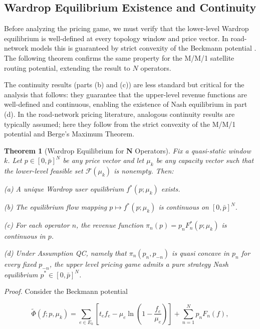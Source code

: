 \documentclass[review,3p,authoryear]{elsarticle}
\newtheorem{theorem}{Theorem}[section]
\begin{document}
\subsection{Wardrop Equilibrium Existence and Continuity}

Before analyzing the pricing game, we must verify that the lower-level Wardrop equilibrium
is well-defined at every topology window and price vector. In road-network models this is guaranteed by strict convexity of the Beckmann potential \citet{beckmann1956studies, daganzo1977traffic}. The following theorem confirms the same property for the M/M/1 satellite routing potential, extending the result to $N$ operators.

The continuity results (parts (b) and (c)) are less standard but critical for the analysis that follows: they guarantee that the upper-level revenue functions are well-defined and continuous, enabling the existence of Nash equilibrium in part (d). In the road-network pricing literature, analogous continuity results are typically assumed; here they follow from the strict convexity of the M/M/1 potential and Berge's Maximum Theorem.

\begin{theorem}[Wardrop Equilibrium for $\bm{N}$ Operators]\label{t1}
Fix a quasi-static window $k$. Let $p{\in}[0,\bar{p}]^{N}$ be any price vector and let ${\mu}_{k}$ be any capacity vector such that the lower-level feasible set $\mathscr{F}({\mu}_{k})$ is nonempty. Then:

(a) A unique Wardrop user equilibrium $f^{*}(p;{\mu}_{k})$ exists.

(b) The equilibrium flow mapping $p {\mapsto} f^{*}(p;{\mu}_{k})$ is continuous on $[0, \bar{p}]^{N}$.

(c) For each operator $n$, the revenue function ${\pi}_{n}(p)=p_{n}F_{n}^{*}(p;{\mu}_{k})$ is continuous in $p$.

(d) Under Assumption QC, namely that ${\pi}_{n}(p_{n},p_{-n})$ is quasi concave in $p_{n}$ for every fixed $p_{-n}$, the upper level pricing game admits a pure strategy Nash equilibrium $p^{*}{\in}[0,\bar{p}]^{N}$.
\end{theorem}

\medskip\noindent\textit{Proof.} Consider the Beckmann potential

\begin{equation}
\tilde{{\Phi}}(f;p,{\mu}_{k})=\sum_{e{\in}E_{k}}^{} \left[t_{e}f_{e}-{\mu}_{e}\ln\left(1 - \frac{f_{e}}{{\mu}_{e}}\right)\right]+\sum_{n=1}^{N} p_{n}F_{n}(f),
\end{equation}
\end{document}

